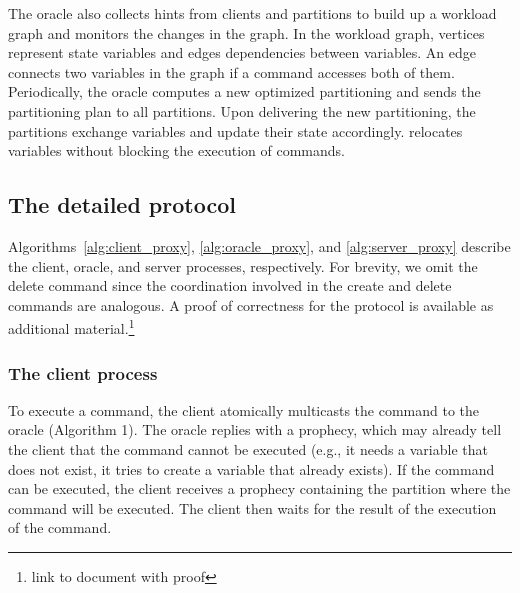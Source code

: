 The oracle also collects hints from clients and partitions to 
build up a workload graph and monitors the changes in the graph. 
In the workload graph, vertices represent state variables and edges dependencies between variables.
An edge connects two variables in the graph if a command accesses both of them.
Periodically, the oracle computes a new optimized partitioning and sends the partitioning plan to all partitions. 
Upon delivering the new partitioning, 
the partitions exchange variables and update their state accordingly.
\dynastar relocates variables without blocking the execution of commands.


\subsection{The detailed protocol}
\label{sec:detailed}

Algorithms~\ref{alg:client_proxy}, \ref{alg:oracle_proxy}, and \ref{alg:server_proxy} describe the client, oracle, and server processes, respectively. 
For brevity, we omit the delete command since the coordination involved in the create and delete commands are analogous. 
A proof of correctness for the protocol is available as additional material.\footnote{link to document with proof}


\subsubsection{The client process} 

To execute a command, the client atomically multicasts the command to the oracle (Algorithm 1).
The oracle replies with a prophecy, which may already tell the client that the command cannot be executed (e.g., it needs a variable that does not exist, it tries to create a variable that already exists).
If the command can be executed, the client receives a prophecy containing the partition where the command will be executed. The client then waits for the result of the execution of the command.




